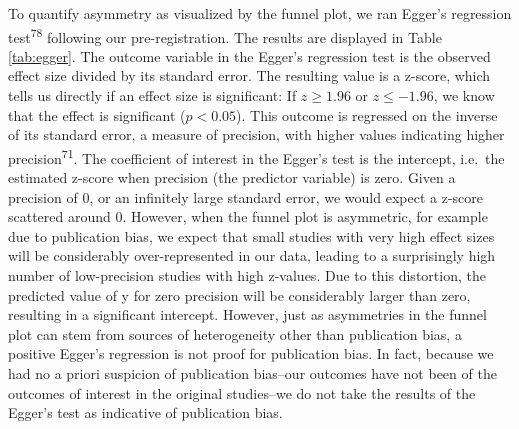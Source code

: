 \documentclass[
  doc,floatsintext]{apa6}
\begin{document}
To quantify asymmetry as visualized by the funnel plot, we ran Egger's regression test\textsuperscript{78} following our pre-registration. The results are displayed in Table \ref{tab:egger}. The outcome variable in the Egger's regression test is the observed effect size divided by its standard error. The resulting value is a z-score, which tells us directly if an effect size is significant: If \(z \geq 1.96\) or \(z \leq -1.96\), we know that the effect is significant (\(p < 0.05\)). This outcome is regressed on the inverse of its standard error, a measure of precision, with higher values indicating higher precision\textsuperscript{71}. The coefficient of interest in the Egger's test is the intercept, i.e.~the estimated z-score when precision (the predictor variable) is zero. Given a precision of 0, or an infinitely large standard error, we would expect a z-score scattered around 0. However, when the funnel plot is asymmetric, for example due to publication bias, we expect that small studies with very high effect sizes will be considerably over-represented in our data, leading to a surprisingly high number of low-precision studies with high z-values. Due to this distortion, the predicted value of y for zero precision will be considerably larger than zero, resulting in a significant intercept. However, just as asymmetries in the funnel plot can stem from sources of heterogeneity other than publication bias, a positive Egger's regression is not proof for publication bias. In fact, because we had no a priori suspicion of publication bias--our outcomes have not been of the outcomes of interest in the original studies--we do not take the results of the Egger's test as indicative of publication bias.
\end{document}
